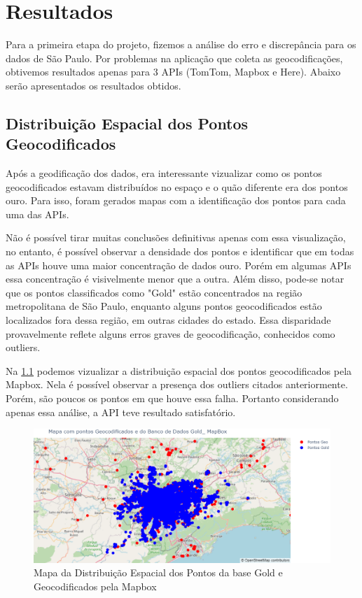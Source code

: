 \chapter{Resultados} \label{resultado}
Para a primeira etapa do projeto, fizemos a análise do erro e discrepância para os dados de São Paulo. Por problemas na aplicação que coleta as geocodificações, obtivemos resultados apenas para 3 APIs (TomTom, Mapbox e Here). Abaixo serão apresentados os resultados obtidos.

\section{Distribuição Espacial dos Pontos Geocodificados}
Após a geodificação dos dados, era interessante vizualizar como os pontos geocodificados estavam distribuídos no espaço e o quão diferente era dos pontos ouro. Para isso, foram gerados mapas com a identificação dos pontos para cada uma das APIs.

Não é possível tirar muitas conclusões definitivas apenas com essa visualização, no entanto, é possível observar a densidade dos pontos e identificar que em todas as APIs houve uma maior concentração de dados ouro. Porém em algumas APIs essa concentração é visivelmente menor que a outra. Além disso, pode-se notar que os pontos classificados como "Gold" estão concentrados na região metropolitana de São Paulo, enquanto alguns pontos geocodificados estão localizados fora dessa região, em outras cidades do estado. Essa disparidade provavelmente reflete alguns erros graves de geocodificação, conhecidos como outliers.

Na \ref{fig:mapapontos1} podemos vizualizar a distribuição espacial dos pontos geocodificados pela Mapbox. Nela é possível observar a presença dos outliers citados anteriormente. Porém, são poucos os pontos em que houve essa falha. Portanto considerando apenas essa análise, a API teve resultado satisfatório.

\begin{figure}[h]
  \centering
  \includegraphics[width=\textwidth]{Figuras/mapapontos1.png}
  \caption{Mapa da Distribuição Espacial dos Pontos da base Gold e Geocodificados pela Mapbox}
  \label{fig:mapapontos1}
\end{figure}

